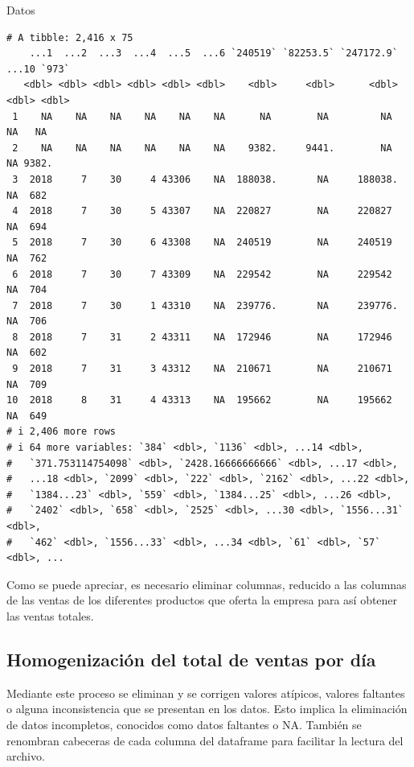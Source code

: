 \documentclass[
  us-letterpaper,
]{scrreprt}
\newenvironment{Shaded}{\begin{snugshade}}{\end{snugshade}}
\newcommand{\NormalTok}[1]{\textcolor[rgb]{0.00,0.23,0.31}{#1}}
\theoremstyle{plain}
\theoremstyle{plain}
\theoremstyle{definition}
\theoremstyle{remark}
\begin{document}
\begin{Shaded}
\begin{Highlighting}[]
\NormalTok{Datos}
\end{Highlighting}
\end{Shaded}

\begin{verbatim}
# A tibble: 2,416 x 75
    ...1  ...2  ...3  ...4  ...5  ...6 `240519` `82253.5` `247172.9` ...10 `973`
   <dbl> <dbl> <dbl> <dbl> <dbl> <dbl>    <dbl>     <dbl>      <dbl> <dbl> <dbl>
 1    NA    NA    NA    NA    NA    NA      NA        NA         NA     NA   NA 
 2    NA    NA    NA    NA    NA    NA    9382.     9441.        NA     NA 9382.
 3  2018     7    30     4 43306    NA  188038.       NA     188038.    NA  682 
 4  2018     7    30     5 43307    NA  220827        NA     220827     NA  694 
 5  2018     7    30     6 43308    NA  240519        NA     240519     NA  762 
 6  2018     7    30     7 43309    NA  229542        NA     229542     NA  704 
 7  2018     7    30     1 43310    NA  239776.       NA     239776.    NA  706 
 8  2018     7    31     2 43311    NA  172946        NA     172946     NA  602 
 9  2018     7    31     3 43312    NA  210671        NA     210671     NA  709 
10  2018     8    31     4 43313    NA  195662        NA     195662     NA  649 
# i 2,406 more rows
# i 64 more variables: `384` <dbl>, `1136` <dbl>, ...14 <dbl>,
#   `371.753114754098` <dbl>, `2428.16666666666` <dbl>, ...17 <dbl>,
#   ...18 <dbl>, `2099` <dbl>, `222` <dbl>, `2162` <dbl>, ...22 <dbl>,
#   `1384...23` <dbl>, `559` <dbl>, `1384...25` <dbl>, ...26 <dbl>,
#   `2402` <dbl>, `658` <dbl>, `2525` <dbl>, ...30 <dbl>, `1556...31` <dbl>,
#   `462` <dbl>, `1556...33` <dbl>, ...34 <dbl>, `61` <dbl>, `57` <dbl>, ...
\end{verbatim}

Como se puede apreciar, es necesario eliminar columnas, reducido a las
columnas de las ventas de los diferentes productos que oferta la empresa
para así obtener las ventas totales.

\subsection{Homogenización del total de ventas por
día}\label{homogenizaciuxf3n-del-total-de-ventas-por-duxeda}

Mediante este proceso se eliminan y se corrigen valores atípicos,
valores faltantes o alguna inconsistencia que se presentan en los datos.
Esto implica la eliminación de datos incompletos, conocidos como datos
faltantes o NA. También se renombran cabeceras de cada columna del
dataframe para facilitar la lectura del archivo.
\end{document}
